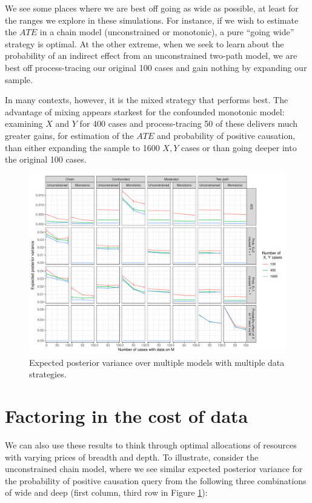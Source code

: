 \documentclass[
  12pt,
]{book}
\begin{document}
We see some places where we are best off going as wide as possible, at least for the ranges we explore in these simulations. For instance, if we wish to estimate the \(ATE\) in a chain model (unconstrained or monotonic), a pure ``going wide'' strategy is optimal. At the other extreme, when we seek to learn about the probability of an indirect effect from an unconstrained two-path model, we are best off process-tracing our original 100 cases and gain nothing by expanding our sample.

In many contexts, however, it is the mixed strategy that performs best. The advantage of mixing appears starkest for the confounded monotonic model: examining \(X\) and \(Y\) for 400 cases and process-tracing 50 of these delivers much greater gains, for estimation of the \(ATE\) and probability of positive causation, than either expanding the sample to 1600 \(X,Y\) cases or than going deeper into the original 100 cases.

\begin{figure}
\centering
\includegraphics{ii_files/figure-latex/morn3-1.pdf}
\caption{\label{fig:morn3}Expected posterior variance over multiple models with multiple data strategies.}
\end{figure}

\hypertarget{factoring-in-the-cost-of-data}{%
\section{Factoring in the cost of data}\label{factoring-in-the-cost-of-data}}

We can also use these results to think through optimal allocations of resources with varying prices of breadth and depth. To illustrate, consider the unconstrained chain model, where we see similar expected posterior variance for the probability of positive causation query from the following three combinations of wide and deep (first column, third row in Figure \ref{fig:morn3}):
\end{document}
